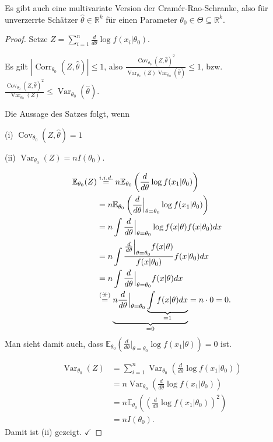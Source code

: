 \documentclass{tstextbook}
\DeclareMathOperator{\Cov}{Cov}
\DeclareMathOperator{\Corr}{Corr}
\DeclareMathOperator{\Var}{Var}
\newcommand{\E}{\mathbb E}
\newcommand{\R}{\mathbb R}
\begin{document}
\begin{remark}
	Es gibt auch eine multivariate Version der Cramér-Rao-Schranke, also für unverzerrte Schätzer $ \hat{\theta}\in\R^k $ für einen Parameter $ \theta_0\in\Theta\subseteq \R^k $.
\end{remark}

\begin{proof}
	Setze $ Z=\sum_{i=1}^{n}\frac{d}{d\theta} \log f(x_i|\theta_0) $. 
	
	Es gilt $ |\Corr_{\theta_0}(Z,\hat{\theta})|\le 1 $, also $ \frac{\Cov_{\theta_0}(Z,\hat{\theta})^2}{\Var_{\theta_0}(Z)\Var_{\theta_0}(\hat{\theta})} \le 1 $, bzw. $ \frac{\Cov_{\theta_0}(Z,\hat{\theta})^2}{\Var_{\theta_0}(Z)} \le \Var_{\theta_0}(\hat{\theta}) $. 
	
	Die Aussage des Satzes folgt, wenn 
	
	(i) $ \Cov_{\theta_0}(Z,\hat{\theta}) = 1 $
	
	(ii) $ \Var_{\theta_0}(Z) = nI(\theta_0) $.
	
	\[
	\begin{aligned}
		\E_{\theta_0}(Z) & \overset{i.i.d.}{=} n\E_{\theta_0}\left(\frac{d}{d\theta}\log f(x_1|\theta_0)\right) \\
		& = n\E_{\theta_0}\left(\frac{d}{d\theta}\Big|_{\theta=\theta_0}\log f(x_1|\theta_0)\right) \\
		& = n \int \frac{d}{d\theta}\Big|_{\theta=\theta_0} \log f(x|\theta)f(x|\theta_0) dx \\
		& = n \int \frac{\frac{d}{d\theta}\Big|_{\theta=\theta_0}f(x|\theta)}{f(x|\theta_0)} f(x|\theta_0) dx \\
		& = n \int \frac{d}{d\theta}\Big|_{\theta=\theta_0}f(x|\theta) dx \\
		& \overset{(\hexstar)}{=} \underbrace{n \frac{d}{d\theta}\Big|_{\theta=\theta_0} \underbrace{\int f(x|\theta) dx}_{=1}}_{=0} = n\cdot 0 = 0.
	\end{aligned}
	\]
	Man sieht damit auch, dass $ \E_{\theta_0}\left(\frac{d}{d\theta}\Big|_{\theta=\theta_0} \log f(x_1|\theta)\right) = 0 $ ist. 
	
	\[
	\begin{aligned}
		\Var_{\theta_0}(Z) & = \sum_{i=1}^{n}\Var_{\theta_0}\left(\frac{d}{d\theta}\log f(x_1|\theta_0)\right) \\
		& = n \Var_{\theta_0} \left(\frac{d}{d\theta}\log f(x_1|\theta_0)\right) \\
		& = n \E_{\theta_0} \left(\left(\frac{d}{d\theta}\log f(x_1|\theta_0)\right)^2\right) \\
		& = n I(\theta_0).
	\end{aligned}
	\]
	Damit ist (ii) gezeigt. $ \checkmark $
	

\end{proof}
\end{document}
